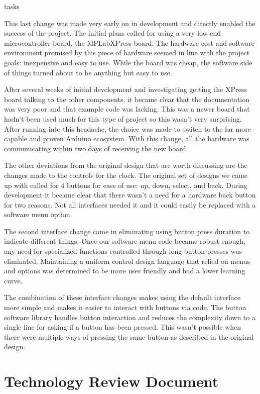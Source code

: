 tasks\documentclass[onecolumn, draftclsnofoot,10pt, compsoc]{IEEEtran}
\begin{document}
This last change was made very early on in development and directly enabled the success of the project.
The initial plans called for using a very low end microcontroller board, the MPLabXPress board.
The hardware cost and software environment promised by this piece of hardware seemed in line with the project goals: inexpensive and easy to use.
While the board was cheap, the software side of things turned about to be anything but easy to use.

After several weeks of initial development and investigating getting the XPress board talking to the other components, it became clear that the documentation was very poor and that example code was lacking.
This was a newer board that hadn’t been used much for this type of project so this wasn’t very surprising.
After running into this headache, the choice was made to switch to the far more capable and proven Arduino ecosystem.
With this change, all the hardware was communicating within two days of receiving the new board.

The other deviations from the original design that are worth discussing are the changes made to the controls for the clock.
The original set of designs we came up with called for 4 buttons for ease of use: up, down, select, and back.
During development it became clear that there wasn’t a need for a hardware back button for two reasons.
Not all interfaces needed it and it could easily be replaced with a software menu option.

The second interface change came in eliminating using button press duration to indicate different things.
Once our software menu code became robust enough, any need for specialized functions controlled through long button presses was eliminated.
Maintaining a uniform control design language that relied on menus and options was determined to be more user friendly and had a lower learning curve.

The combination of these interface changes makes using the default interface more simple and makes it easier to interact with buttons via code.
The button software library handles button interaction and reduces the complexity down to a single line for asking if a button has been pressed.
This wasn’t possible when there were multiple ways of pressing the same button as described in the original design.


\section{Technology Review Document}
\end{document}
